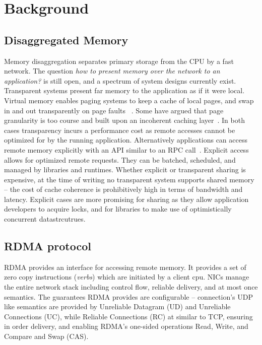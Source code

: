 \section{Background}

\subsection{Disaggregated Memory}

Memory disaggregation separates primary storage from the CPU
by a fast network. The question \textit{how to present
memory over the network to an application?} is still open,
and a spectrum of system designs currently exist.
Transparent systems present far memory to the application as
if it were local. Virtual memory enables paging systems to
keep a cache of local pages, and swap in and out
transparently on page faults ~\cite{infiniswap, leap,
fastswap}.  Some have argued that page granularity is too
course and built upon an incoherent caching
layer~\cite{kona, legoos}.  In both cases transparency
incurs a performance cost as remote accesses cannot be
optimized for by the running application.
Alternatively applications can access remote memory
explicitly with an API similar to an RPC
call~\cite{aifm,reigons,clover,sherman,faast}. Explicit
access allows for optimized remote requests. They can be
batched, scheduled, and managed by libraries and runtimes. 
Whether explicit or transparent sharing is expensive, at the
time of writing no transparent system supports shared memory
-- the cost of cache coherence is prohibitively high in
terms of bandwidth and latency. Explicit cases are more
promising for sharing as they allow application developers
to acquire locks, and for libraries to make use of
optimistically concurrent datastrcutrues.

\subsection{RDMA protocol}

RDMA provides an interface for accessing remote memory. It
provides a set of zero copy instructions (\textit{verbs})
which are initiated by a client cpu. NICs manage the entire
network stack including control flow, reliable delivery, and
at most once semantics. The guarantees RDMA provides are
configurable -- connection's UDP like semantics are provided
by Unreliable Datagram (UD) and Unreliable Connections (UC),
while Reliable Connections (RC) at similar to TCP, ensuring
in order delivery, and enabling RDMA's one-sided operations
Read, Write, and Compare and Swap (CAS).

